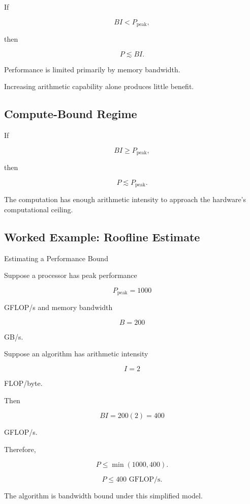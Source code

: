 If

\[
BI<P_{\mathrm{peak}},
\]

then

\[
\boxed{
P
\lesssim
BI.
}
\]

Performance is limited primarily by memory bandwidth.

Increasing arithmetic capability alone produces little benefit.

\subsection{Compute-Bound Regime}
\label{subsec:compute-bound-regime}

If

\[
BI\geq P_{\mathrm{peak}},
\]

then

\[
\boxed{
P
\lesssim
P_{\mathrm{peak}}.
}
\]

The computation has enough arithmetic intensity to approach the hardware's
computational ceiling.

\subsection{Worked Example: Roofline Estimate}
\label{subsec:worked-roofline-estimate}

\begin{workedexamplebox}{Estimating a Performance Bound}

Suppose a processor has peak performance

\[
P_{\mathrm{peak}}
=
1000
\]

GFLOP/s and memory bandwidth

\[
B
=
200
\]

GB/s.

Suppose an algorithm has arithmetic intensity

\[
I
=
2
\]

FLOP/byte.

Then

\[
BI
=
200(2)
=
400
\]

GFLOP/s.

Therefore,

\[
P
\leq
\min(1000,400).
\]

\begin{answerbox}
\[
\boxed{
P
\leq
400\text{ GFLOP/s}.
}
\]
\end{answerbox}

The algorithm is bandwidth bound under this simplified model.

\end{workedexamplebox}

